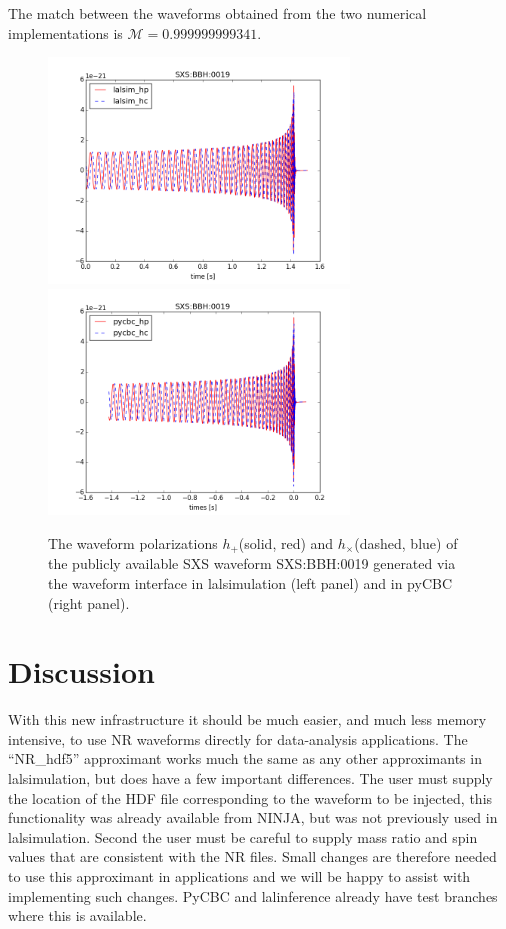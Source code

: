 \documentclass[aps,prd,amssymb,amsmath,amsfonts,superscriptaddress,
floatfix ,preprintnumbers,altaffilletter]{revtex4}
\begin{document}
The match between the waveforms obtained from the two numerical implementations is $\mathcal{M}=0.999999999341$.
\begin{figure}
\begin{center}
\includegraphics[width=80mm]{lalsim_TD_0019.png}
\includegraphics[width=80mm]{pycbc_TD_0019.png}
\caption{The waveform polarizations $h_+$(solid, red) and $h_\times$(dashed, blue) of the publicly available SXS waveform SXS:BBH:0019 
generated via the waveform interface in lalsimulation (left panel) and in pyCBC (right panel).}
\label{fig:waveforms}
\end{center}
\end{figure}


\section{Discussion}
\label{sec:discussion}

With this new infrastructure it should be much easier, and much less memory intensive, to use NR waveforms
directly for data-analysis applications. The ``NR\_hdf5'' approximant works much the same as any other approximants
in lalsimulation, but does have a few important differences. The user must supply the location of the HDF file
corresponding to the waveform to be injected, this functionality was already available from NINJA, but was not
previously used in lalsimulation. Second the user must be careful to supply mass ratio and spin values that
are consistent with the NR files. Small changes are therefore needed to use this approximant in applications
and we will be happy to assist with implementing such changes. PyCBC and lalinference already have test branches
where this is available.
\end{document}
